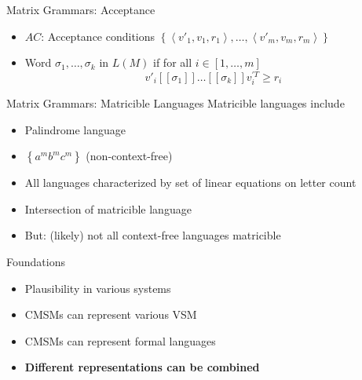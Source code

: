 \documentclass[12pt,a4paper]{beamer}
\newcommand{\tuple}[1]{\ensuremath{\left \langle #1 \right \rangle }}
\newcommand{\setof}[1]{\ensuremath{\left \{ #1 \right \}}}
\begin{document}
\begin{frame}{Matrix Grammars: Acceptance}
\begin{itemize}
\item $AC$: Acceptance conditions $ \setof{ \tuple{v'_{1}, v_{1}, r_{1}}, \ldots, \tuple{v'_{m}, v_{m}, r_{m}} }$
\item Word $\sigma_{1},\ldots,\sigma_{k}$ in $L(M)$ if for all $i \in [1,\ldots,m]$ 
$$v'_{i}[[\sigma_{1}]] \ldots [[\sigma_{k}]] v_{i}^{'T} \ge r_{i}$$
\end{itemize}
\end{frame}


\begin{frame}{Matrix Grammars: Matricible Languages}
Matricible languages include
\begin{itemize}
\item Palindrome language
\item $\setof{ a^{m} b ^{m} c^{m}  }$ (non-context-free)
\item All languages characterized by set of linear equations on letter count
\item Intersection of matricible language
\item But: (likely) not all context-free languages matricible
\end{itemize}
\end{frame}



\begin{frame}{Foundations}
\begin{itemize}
\item Plausibility in various systems
\item CMSMs can represent various VSM
\item CMSMs can represent formal languages
\item \textbf{Different representations can be combined}
\end{itemize}
\end{frame}
\end{document}
